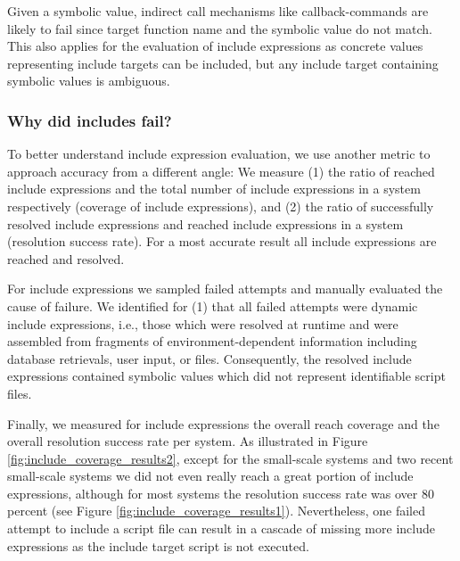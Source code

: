 \documentclass[preprint]{sig-alternate-05-2015}
\begin{document}
Given a symbolic value, indirect call mechanisms like callback-commands are likely to fail since target function name and the symbolic value do not match. This also applies for the evaluation of include expressions as concrete values representing include targets can be included, but any include target containing symbolic values is ambiguous.

\subsubsection{Why did includes fail?}
\label{WhyDidIncludesFail}
To better understand include expression evaluation, we use another metric to approach accuracy from a different angle: We measure (1) the ratio of reached include expressions and the total number of include expressions in a system respectively (coverage of include expressions), and (2) the ratio of successfully resolved include expressions and reached include expressions in a system (resolution success rate). For a most accurate result all include expressions are reached and resolved.

For include expressions we sampled failed attempts and manually evaluated the cause of failure. We identified for (1) that all failed attempts were dynamic include expressions, i.e., those which were resolved at runtime and were assembled from fragments of environment-dependent information including database retrievals, user input, or files. Consequently, the resolved include expressions contained symbolic values which did not represent identifiable script files.

Finally, we measured for include expressions the overall reach coverage and the overall resolution success rate per system. As illustrated in Figure \ref{fig:include_coverage_results2}, except for the small-scale systems and two recent small-scale systems we did not even really reach a great portion of include expressions, although for most systems the resolution success rate was over 80 percent (see Figure \ref{fig:include_coverage_results1}). Nevertheless, one failed attempt to include a script file can result in a cascade of missing more include expressions as the include target script is not executed.
\end{document}
